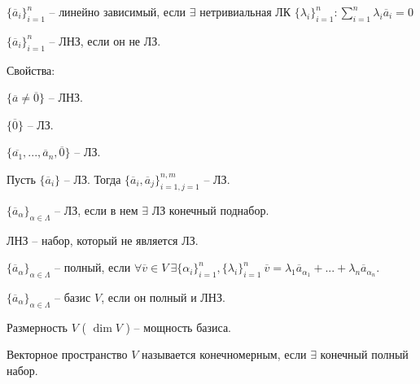 	\begin{Def}
		$\{\overline{a}_i\}_{i = 1}^n$ -- линейно зависимый, если $\exists$ нетривиальная ЛК $\{\lambda_i\}_{i = 1}^n : \sum_{i = 1}^n \lambda_i \overline{a}_i = 0$   
	\end{Def}

	\begin{Def}
		$\{\overline{a}_i\}_{i = 1}^n$ -- ЛНЗ, если он не ЛЗ. 
	\end{Def}

	Свойства:
	\begin{MyList}
		\item $\{\overline{a} \neq \overline{0}\}$ -- ЛНЗ.
		\item $\{\overline{0}\}$ -- ЛЗ.
		\item $\{\overline{a_1}, ..., \overline{a}_n, \overline{0}\}$ -- ЛЗ.
		\item Пусть $\{\overline{a}_i\}$ -- ЛЗ. Тогда $\{\overline{a}_i, \overline{a}_j\}_{i = 1, j = 1}^{n, m}$ -- ЛЗ.
	\end{MyList}

	\begin{Def}
		$\{\overline{a}_\alpha\}_{\alpha \in \Lambda}$ -- ЛЗ, если в нем $\exists$ ЛЗ конечный поднабор.
	\end{Def}

	\begin{Def}
		ЛНЗ -- набор, который не является ЛЗ.
	\end{Def}

	\begin{Def}
		$\{\overline{a}_\alpha\}_{\alpha \in \Lambda}$ -- полный, если $\forall \overline{v} \in V \ \exists \{\alpha_i\}_{i = 1}^n, \{\lambda_i\}_{i = 1}^n \ \overline{v} = \lambda_1 \overline{a}_{\alpha_1} + ... + \lambda_n \overline{a}_{\alpha_n}$.
	\end{Def}

	\begin{Def}
		$\{\overline{a}_\alpha\}_{\alpha \in \Lambda}$ -- базис $V$, если он полный и ЛНЗ.
	\end{Def}

	\begin{Def}
		Размерность $V$ ( $\dim V$ ) -- мощность базиса.
	\end{Def}

	\begin{Def}
		Векторное пространство $V$ называется конечномерным, если $\exists$ конечный полный набор.
	\end{Def}

    \gdef\AuthorName{Дарья Гольденберг}

